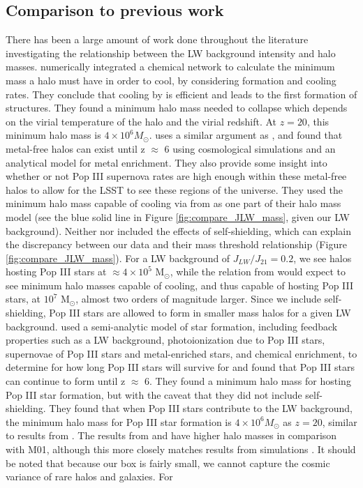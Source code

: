 \documentclass[a4paper,fleqn,usenatbib]{mnras}
\begin{document}
\subsection{Comparison to previous work}

There has been a large amount of work done throughout the literature investigating the relationship between the LW background intensity and halo masses. \citet{Tegmark97} numerically integrated a chemical network to calculate the minimum mass a halo must have in order to cool, by considering \hh{} formation and cooling rates. They conclude that cooling by \hh{} is efficient and leads to the first formation of structures. They found a minimum halo mass needed to collapse which depends on the virial temperature of the halo and the virial redshift. At $z = 20$, this minimum halo mass is $4 \times 10^{6} M_{\odot}$. \citet{Trenti09} uses a similar argument as \citet{Tegmark97}, and found that metal-free halos can exist until z $\approx$ 6 using cosmological simulations and an analytical model for metal enrichment. They also provide some insight into whether or not Pop III supernova rates are high enough within these metal-free halos to allow for the LSST to see these regions of the universe. They used the minimum halo mass capable of cooling via \hh{} from \citet{Trenti09_SFR} as one part of their halo mass model (see the blue solid line in Figure \ref{fig:compare_JLW_mass}, given our LW background). Neither \citet{Trenti09} nor \citet{Tegmark97} included the effects of \hh{} self-shielding, which can explain the discrepancy between our data and their mass threshold relationship (Figure \ref{fig:compare_JLW_mass}). For a LW background of $J_{LW} / J_{21} = 0.2$, we see halos hosting Pop III stars at $\approx 4 \times 10^{5}$ M$_{\odot}$, while the relation from \citet{Trenti09_SFR} would expect to see minimum halo masses capable of cooling, and thus capable of hosting Pop III stars, at $10^7$ M$_{\odot}$, almost two orders of magnitude larger. Since we include \hh{} self-shielding, Pop III stars are allowed to form in smaller mass halos for a given LW background. \citet{Mebane18} used a semi-analytic model of star formation, including feedback properties such as a LW background, photoionization due to Pop III stars, supernovae of Pop III stars and metal-enriched stars, and chemical enrichment, to determine for how long Pop III stars will survive for and found that Pop III stars can continue to form until z $\approx$ 6. They found a minimum halo mass for hosting Pop III star formation, but with the caveat that they did not include \hh{} self-shielding. They found that when Pop III stars contribute to the LW background, the minimum halo mass for Pop III star formation is $4 \times 10^{6} M_{\odot}$ as $z = 20$, similar to results from \citet{Tegmark97}. The results from \citet{Trenti09} and \citet{Mebane18} have higher halo masses in comparison with M01, although this more closely matches results from simulations \citet[see][]{Wise07_UVB, OShea08}. It should be noted that because our box is fairly small, we cannot capture the cosmic variance of rare halos and galaxies. For 
\end{document}
